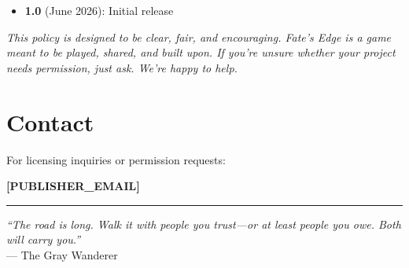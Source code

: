 \documentclass[11pt]{article}
\begin{document}
\begin{itemize}[leftmargin=*, itemsep=2pt]
  \item \textbf{1.0} (June 2026): Initial release
\end{itemize}

\vspace{0.3in}

\noindent \textit{This policy is designed to be clear, fair, and encouraging. Fate's Edge is a game meant to be played, shared, and built upon. If you're unsure whether your project needs permission, just ask. We're happy to help.}

\section*{Contact}

For licensing inquiries or permission requests:

\vspace{0.1in}
\noindent \textbf{[PUBLISHER\_EMAIL]}

\vspace{0.3in}

\noindent\rule{\linewidth}{0.4pt}

\vspace{0.2in}
\noindent \textit{``The road is long. Walk it with people you trust---or at least people you owe. Both will carry you.''}\\
\hspace*{0.5in}--- The Gray Wanderer
\end{document}
